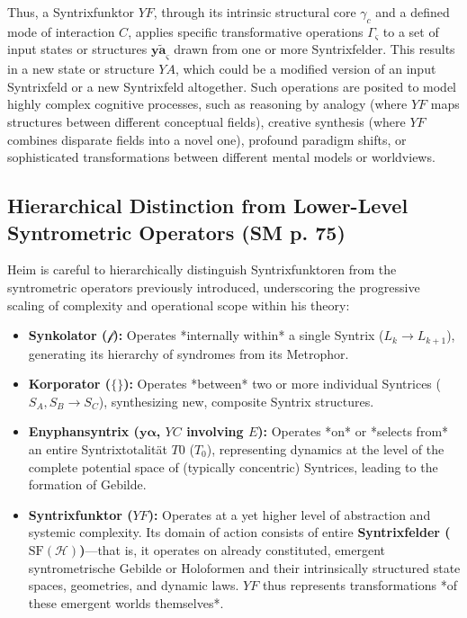 \documentclass[
    12pt,              %
    a4paper,           %
    headings=normal,   %
    twoside=true,      %
    BCOR=8mm,          %
]{scrbook}
\newcommand{\synkolator}{\mathcal{f}}
\newcommand{\syntrixtotalitaet}{T0}
\newcommand{\diskreteEnyphansyntrix}{\bm{y\alpha}}
\newcommand{\kontinuierlicheEnyphansyntrix}{YC}
\newcommand{\enyphane}{E}
\newcommand{\syntrixfunktor}{YF}
\begin{document}
Thus, a Syntrixfunktor \(\syntrixfunktor\), through its intrinsic structural core \(\gamma_c\) and a defined mode of interaction \(C\), applies specific transformative operations \(\Gamma_\varsigma\) to a set of input states or structures \(\bm{y\widetilde{a}}_\varsigma\) drawn from one or more Syntrixfelder. This results in a new state or structure \(YA\), which could be a modified version of an input Syntrixfeld or a new Syntrixfeld altogether. Such operations are posited to model highly complex cognitive processes, such as reasoning by analogy (where \(\syntrixfunktor\) maps structures between different conceptual fields), creative synthesis (where \(\syntrixfunktor\) combines disparate fields into a novel one), profound paradigm shifts, or sophisticated transformations between different mental models or worldviews.

\subsection{Hierarchical Distinction from Lower-Level Syntrometric Operators (SM p. 75)}
\label{sec:ch4_sf_distinction_revised_2}

Heim is careful to hierarchically distinguish Syntrixfunktoren from the syntrometric operators previously introduced, underscoring the progressive scaling of complexity and operational scope within his theory:
\begin{itemize}
    \item   \textbf{Synkolator (\(\synkolator\)):} Operates *internally within* a single Syntrix (\(L_k \to L_{k+1}\)), generating its hierarchy of syndromes from its Metrophor.
    \item   \textbf{Korporator (\(\{ \}\)):} Operates *between* two or more individual Syntrices (\(S_A, S_B \to S_C\)), synthesizing new, composite Syntrix structures.
    \item   \textbf{Enyphansyntrix (\(\diskreteEnyphansyntrix\), \(\kontinuierlicheEnyphansyntrix\) involving \(\enyphane\)):} Operates *on* or *selects from* an entire Syntrixtotalität \(\syntrixtotalitaet\) (\(T_0\)), representing dynamics at the level of the complete potential space of (typically concentric) Syntrices, leading to the formation of Gebilde.
    \item   \textbf{Syntrixfunktor (\(\syntrixfunktor\)):} Operates at a yet higher level of abstraction and systemic complexity. Its domain of action consists of entire \textbf{Syntrixfelder (\(\text{SF}(\mathcal{H})\))}—that is, it operates on already constituted, emergent syntrometrische Gebilde or Holoformen and their intrinsically structured state spaces, geometries, and dynamic laws. \(\syntrixfunktor\) thus represents transformations *of these emergent worlds themselves*.
\end{itemize}
\end{document}
